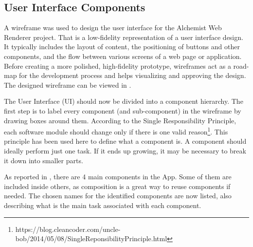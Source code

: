 \subsection{User Interface Components}
\label{ssec:user-interface-components}

A wireframe was used to design the user interface for the Alchemist Web Renderer project. That is a low-fidelity representation of a user interface design. It typically includes the layout of content, the positioning of buttons and other components, and the flow between various screens of a web page or application. Before creating a more polished, high-fidelity prototype, wireframes act as a road-map for the development process and helps visualizing and approving the design. The designed wireframe can be viewed in .\newline


The User Interface (UI) should now be divided into a component hierarchy. The first step is to label every component (and sub-component) in the wireframe by drawing boxes around them.
According to the Single Responsibility Principle, each software module should change only if there is one valid reason\footnote{https://blog.cleancoder.com/uncle-bob/2014/05/08/SingleReponsibilityPrinciple.html}. This principle has been used here to define what a component is. A component should ideally perform just one task. If it ends up growing, it may be necessary to break it down into smaller parts.


As reported in , there are 4 main components in the App. Some of them are included inside others, as composition is a great way to reuse components if needed. The chosen names for the identified components are now listed, also describing what is the main task associated with each component.

